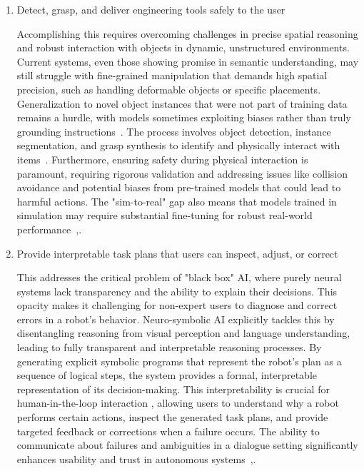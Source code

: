 \documentclass[12pt]{extarticle}
\begin{document}
\begin{enumerate}
  \item Detect, grasp, and deliver engineering tools safely to the user

  Accomplishing this requires overcoming challenges in precise spatial reasoning and robust interaction with objects in dynamic, unstructured environments. Current systems, even those showing promise in semantic understanding, may still struggle with fine-grained manipulation that demands high spatial precision, such as handling deformable objects or specific placements. Generalization to novel object instances that were not part of training data remains a hurdle, with models sometimes exploiting biases rather than truly grounding instructions~\cite{cliport}. The process involves object detection, instance segmentation, and grasp synthesis to identify and physically interact with items~\cite{enhancing-interpret}. Furthermore, ensuring safety during physical interaction is paramount, requiring rigorous validation and addressing issues like collision avoidance and potential biases from pre-trained models that could lead to harmful actions. The "sim-to-real" gap also means that models trained in simulation may require substantial fine-tuning for robust real-world performance~\cite{enhancing-interpret},\cite{cliport}.

  \item Provide interpretable task plans that users can inspect, adjust, or correct

  This addresses the critical problem of "black box" AI, where purely neural systems lack transparency and the ability to explain their decisions. This opacity makes it challenging for non-expert users to diagnose and correct errors in a robot's behavior. Neuro-symbolic AI explicitly tackles this by disentangling reasoning from visual perception and language understanding, leading to fully transparent and interpretable reasoning processes. By generating explicit symbolic programs that represent the robot's plan as a sequence of logical steps, the system provides a formal, interpretable representation of its decision-making. This interpretability is crucial for human-in-the-loop interaction , allowing users to understand why a robot performs certain actions, inspect the generated task plans, and provide targeted feedback or corrections when a failure occurs. The ability to communicate about failures and ambiguities in a dialogue setting significantly enhances usability and trust in autonomous systems~\cite{enhancing-interpret},\cite{nsai}.




\end{enumerate}
\end{document}

